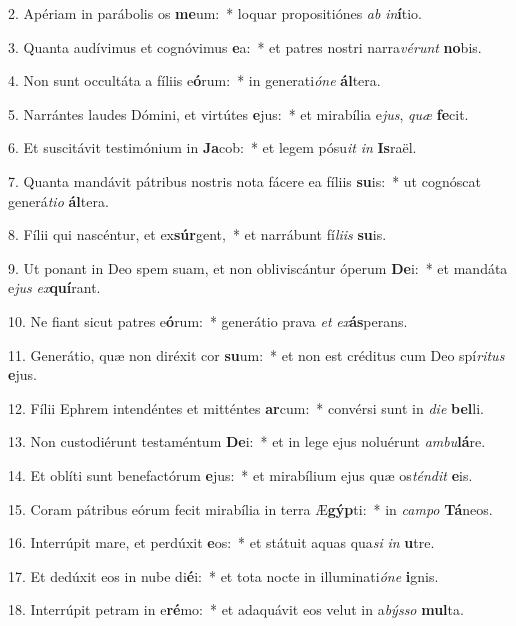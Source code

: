 2. Apériam in parábolis os \textbf{me}um:~*  loquar propositiónes \textit{ab} \textit{in}\textbf{í}tio.\

3. Quanta audívimus et cognóvimus \textbf{e}a:~*  et patres nostri narra\textit{vé}\textit{runt} \textbf{no}bis.\

4. Non sunt occultáta a fíliis e\textbf{ó}rum:~*  in generati\textit{ó}\textit{ne} \textbf{ál}tera.\

5. Narrántes laudes Dómini, et virtútes \textbf{e}jus:~*  et mirabília e\textit{jus}, \textit{quæ} \textbf{fe}cit.\

6. Et suscitávit testimónium in \textbf{Ja}cob:~*  et legem pósu\textit{it} \textit{in} \textbf{Is}raël.\

7. Quanta mandávit pátribus nostris nota fácere ea fíliis \textbf{su}is:~*  ut cognóscat generá\textit{ti}\textit{o} \textbf{ál}tera.\

8. Fílii qui nascéntur, et ex\textbf{súr}gent,~*  et narrábunt fí\textit{li}\textit{is} \textbf{su}is.\

9. Ut ponant in Deo spem suam, et non obliviscántur óperum \textbf{De}i:~*  et mandáta e\textit{jus} \textit{ex}\textbf{quí}rant.\

10. Ne fiant sicut patres e\textbf{ó}rum:~*  generátio prava \textit{et} \textit{ex}\textbf{ás}perans.\

11. Generátio, quæ non diréxit cor \textbf{su}um:~*  et non est créditus cum Deo spí\textit{ri}\textit{tus} \textbf{e}jus.\

12. Fílii Ephrem intendéntes et mitténtes \textbf{ar}cum:~*  convérsi sunt in \textit{di}\textit{e} \textbf{bel}li.\

13. Non custodiérunt testaméntum \textbf{De}i:~*  et in lege ejus noluérunt \textit{am}\textit{bu}\textbf{lá}re.\

14. Et oblíti sunt benefactórum \textbf{e}jus:~*  et mirabílium ejus quæ os\textit{tén}\textit{dit} \textbf{e}is.\

15. Coram pátribus eórum fecit mirabília in terra Æ\textbf{gýp}ti:~*  in \textit{cam}\textit{po} \textbf{Tá}neos.\

16. Interrúpit mare, et perdúxit \textbf{e}os:~*  et státuit aquas qua\textit{si} \textit{in} \textbf{u}tre.\

17. Et dedúxit eos in nube di\textbf{é}i:~*  et tota nocte in illuminati\textit{ó}\textit{ne} \textbf{i}gnis.\

18. Interrúpit petram in e\textbf{ré}mo:~*  et adaquávit eos velut in a\textit{býs}\textit{so} \textbf{mul}ta.\

